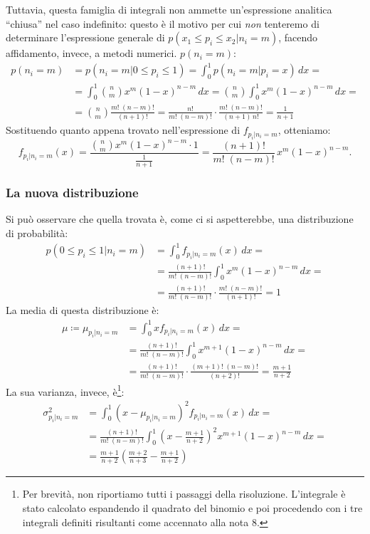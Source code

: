 \documentclass{article}
\begin{document}
\begin{appendices}
{Tuttavia, questa famiglia di integrali non ammette un'espressione analitica “chiusa”
nel caso indefinito: questo è il motivo per cui \emph{non} tenteremo di determinare l'espressione
generale di $p(x_1\le p_i\le x_2|n_i=m)$, facendo affidamento, invece, a metodi numerici.
} $p(n_i=m)$:
\[\begin{aligned}
p(n_i=m)&=p(n_i=m|0\le p_i\le 1) = \int_{0}^{1}p(n_i=m|p_i=x)\,dx=\\
        &=\int_{0}^{1}\binom{n}{m}x^m (1-x)^{n - m}\,dx=\binom{n}{m}\int_{0}^{1}x^m(1-x)^{n - m}\,dx=\\
        &=\binom{n}{m}\frac{m!\;(n-m)!}{(n+1)!}
        =\frac{n!}{m!\;(n-m)!}\cdot\frac{m!\;(n-m)!}{(n+1)\,n!}
        =\frac{1}{n+1}
\end{aligned}\]
Sostituendo quanto appena trovato nell'espressione di $f_{p_i|n_i=m}$, otteniamo:
\[f_{p_i|n_i=m}(x)=\frac{\binom{n}{m}x^m(1-x)^{n-m}\cdot 1}{\frac{1}{n+1}}
=\frac{(n+1)!}{m!\;(n-m)!}\,x^m(1-x)^{n-m}.\]

\subsubsection{La nuova distribuzione}
Si può osservare che quella trovata è, come ci si aspetterebbe, una distribuzione di probabilità:
\[\begin{aligned}
p(0\le p_i\le 1|n_i=m)  &= \int_{0}^{1}f_{p_i|n_i=m}(x)\,dx = \\
                        &= \frac{(n+1)!}{m!\;(n-m)!}\int_{0}^{1}x^m(1-x)^{n-m}\,dx = \\
                        &= \frac{(n+1)!}{m!\;(n-m)!}\cdot\frac{m!\;(n-m)!}{(n+1)!} = 1
\end{aligned}\]
La media di questa distribuzione è:
\[\begin{aligned}
\mu \coloneqq \mu_{p_i|n_i=m} &= \int_{0}^{1}xf_{p_i|n_i=m}(x)\,dx = \\
    &= \frac{(n+1)!}{m!\;(n-m)!}\int_{0}^{1}x^{m+1}(1-x)^{n-m}\,dx = \\
    &= \frac{(n+1)!}{m!\;(n-m)!}\cdot\frac{(m+1)!\;(n-m)!}{(n+2)!} =
    \frac{m+1}{n+2}
\end{aligned}\]
La sua varianza, invece, è\footnote{
Per brevità, non riportiamo tutti i passaggi della risoluzione. L'integrale è stato
calcolato espandendo il quadrato del binomio e poi procedendo con i tre integrali definiti
risultanti come accennato alla nota 8.
}:
\[\begin{aligned}
\sigma_{p_i|n_i=m}^2 &= \int_{0}^{1}(x-\mu_{p_i|n_i=m})^2f_{p_i|n_i=m}(x)\,dx = \\
&= \frac{(n+1)!}{m!\;(n-m)!}\int_{0}^{1}\left(x-\frac{m+1}{n+2}\right)^2x^{m+1}(1-x)^{n-m}\,dx = \\
&= \frac{m+1}{n+2}\left(\frac{m+2}{n+3}-\frac{m+1}{n+2}\right)
\end{aligned}\]


\end{appendices}
\end{document}
